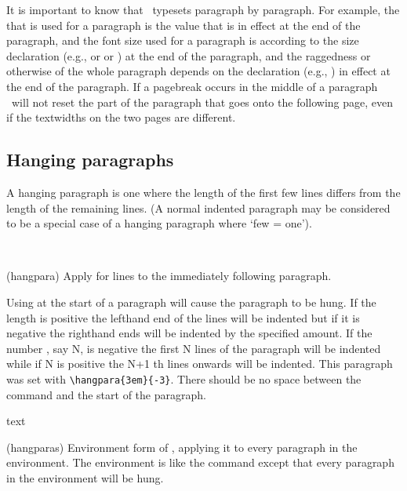     It is important to know that \ltx\ 
typesets 
paragraph by paragraph. 
For example, the \lnc{\baselineskip} that is used for a paragraph is the value
that is in effect at the end of the paragraph, and the font size used for a
paragraph is according to the size declaration (e.g., \cmd{\large} or 
\cmd{\normalsize} or \cmd{\small}) at the end of the paragraph, 
and the raggedness or otherwise of the whole paragraph depends on
the declaration (e.g., \cmd{\centering})  in effect at the end of 
the paragraph. If a pagebreak occurs in the middle of a paragraph \tx\
will not reset the part of the paragraph that goes onto the following
page, even if the textwidths on the two pages are different.

\subsection{Hanging paragraphs}


    A hanging paragraph is one where the length of the first few lines differs
from the length of the remaining lines. (A normal indented paragraph 
may be considered 
to be a special case of a hanging paragraph where `few = one'). 

\begin{syntax}
\cmd{\hangpara} \\
\end{syntax}
\glossary(hangpara)%
  {}%
  {Apply  for  lines to the immediately following 
   paragraph.}

%
 Using \cmd{\hangpara} at the start of a paragraph will cause the paragraph
to be hung. If the length  is positive the lefthand end of the 
lines will be indented but if it is negative the righthand ends will be 
indented by the specified amount.
    If the number \meta{num}, say N, is negative the first N lines of
the paragraph will be indented while if N is positive the N+1 th lines onwards
will be indented. This paragraph was set with \verb?\hangpara{3em}{-3}?. There 
should be no space between the \cmd{\hangpara} command and the start of the
paragraph.

\begin{syntax}
 text  \\
\end{syntax}
\glossary(hangparas)%
  {}%
  {Environment form of , applying it to every paragraph in the
   environment.}
    The \Ie{hangparas} environment is like the \cmd{\hangpara} command except
that every paragraph in the environment will be hung.

